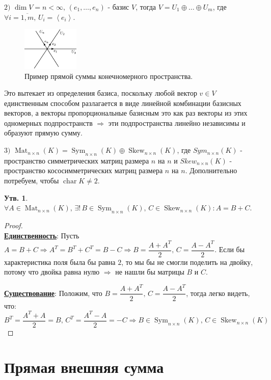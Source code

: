 \documentclass[12pt]{article}
\theoremstyle{definition}
\newtheorem{prop}{Утв.}
\newcommand{\linsp}[1]{\left\langle #1 \right\rangle }
\newcommand{\mat}[2]{\operatorname{Mat}_{#1\times #2}}
\begin{document}
$2)$  $\dim{V} = n < \infty, \, (e_1, \dotsc, e_n)$ - базис $V$, тогда $V = U_1 \oplus \dotsc \oplus U_m$, где $\forall i = \overline{1,m}, \, U_i = \linsp{e_i}$. 
\begin{figure}[H]
	\centering
	\includegraphics[width=0.24\textwidth]{LAL3_4.eps}
	\caption{Пример прямой суммы конечномерного пространства.}
	\label{3_4}
\end{figure}
Это вытекает из определения базиса, поскольку любой вектор $v \in V$ единственным способом разлагается в виде линейной комбинации базисных векторов, а векторы пропорциональные базисным это как раз векторы из этих одномерных подпространств $\Rightarrow$ эти подпространства линейно независимы и образуют прямую сумму.

$3)$ $\mat{n}{n}{(K)} = \operatorname{Sym}_{n\times n}{(K)} \oplus \operatorname{Skew}_{n\times n}{(K)}$, где $ Sym_{n\times n}{(K)}$ - пространство симметрических матриц размера $n$ на $n$ и $Skew_{n\times n}{(K)}$ - пространство кососимметрических матриц размера $n$ на $n$.  Дополнительно потребуем, чтобы $\operatorname{char}{K} \neq 2$.
\begin{prop}
	$\forall A \in \mat{n}{n}{(K)}, \, \exists! \, B \in  \operatorname{Sym}_{n\times n}{(K)}, \, C \in \operatorname{Skew}_{n\times n}{(K)} \colon A = B + C$.
\end{prop}
\begin{proof}\hfill\\
	\textbf{\uline{Единственность}}: Пусть $A = B + C \Rightarrow A^T = B^T + C^T = B - C \Rightarrow B = \dfrac{A + A^T}{2}, \, C = \dfrac{A - A^T}{2}$. Если бы характеристика поля была бы равна $2$, то мы бы не смогли поделить на двойку, потому что двойка равна нулю $\Rightarrow$ не нашли бы матрицы $B$ и $C$.
	
	\textbf{\uline{Существование}}: Положим, что $B = \dfrac{A + A^T}{2}, \, C = \dfrac{A - A^T}{2}$, тогда легко видеть, что: 
	$$
		B^T = \dfrac{A^T + A}{2} = B, \, C^T = \dfrac{A^T - A}{2} = - C \Rightarrow B \in  \operatorname{Sym}_{n\times n}{(K)}, \, C \in \operatorname{Skew}_{n\times n}{(K)}
	$$
\end{proof}
\section*{Прямая внешняя сумма}
\end{document}
